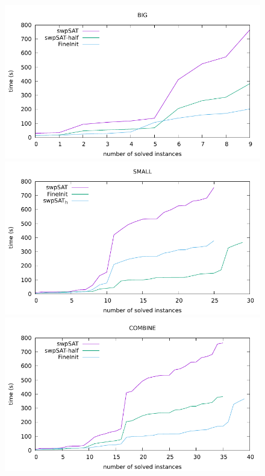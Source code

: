 \documentclass[12pt,a4paper,twoside]{scrartcl}
\numberwithin{equation}{section}
\begin{document}
 \begin{figure}[H]
\begin{center}
  \includegraphics[scale = 1]{DATA/BIG/a4.pdf}
    \includegraphics[scale = 1]{DATA/SMALL/a4.pdf}
    \includegraphics[scale = 1]{DATA/COMBINE/a4.pdf}
  \end{center}
  \caption{}
  \label{Experiment 6 COMBINE}
  \end{figure} 
\clearpage
\end{document}
